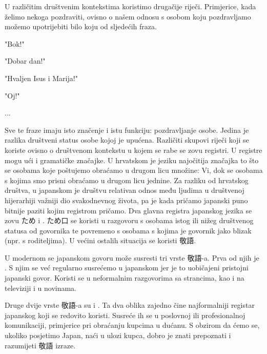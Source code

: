 
\author{Ivan Petranović}

	
	
	U različitim društvenim kontekstima koristimo drugačije riječi. Primjerice, kada želimo nekoga pozdraviti, ovisno o našem odnosu s osobom koju pozdravljamo možemo upotrijebiti bilo koju od sljedećih fraza.
	\begin{hyou}
	\item "Bok!"
	\item "Dobar dan!"
	\item "Hvaljen Isus i Marija!"
	\item "Oj!"
	\item ...
	\end{hyou}
	Sve te fraze imaju isto značenje i istu funkciju: pozdravljanje osobe. Jedina je razlika društveni status osobe kojoj je upućena. Različiti skupovi riječi koji se koriste ovisno o društvenom kontekstu u kojem se rabe se zovu registri. U registre mogu ući i gramatičke značajke. U hrvatskom je jeziku najočitija značajka to što se osobama koje poštujemo obraćamo u drugom licu množine: Vi, dok se osobama s kojima smo prisni obraćamo u drugom licu jednine.
	Za razliku od hrvatskog društva, u japanskom je društvu relativan odnos među ljudima u društvenoj hijerarhiji važniji dio svakodnevnog života, pa je kada pričamo japanski puno bitnije paziti kojim registrom pričamo.
	Dva glavna registra japanskog jezika se zovu ため i . ため口 se koristi u razgovoru s osobama istog ili nižeg društvenog statusa od govornika te povremeno s osobama s kojima je govornik jako blizak (npr. s roditeljima). U većini ostalih situacija se koristi 敬語.

	
	U modernom se japanskom govoru može susresti tri vrste 敬語-a. Prva od njih je . S njim se već regularno susrećemo u japanskom jer je to uobičajeni pristojni japanski govor. Koristi se u neformalnim razgovorima sa strancima, kao i na televiziji i u novinama.
		
	Druge dvije vrste 敬語-a su  i . Ta dva oblika zajedno čine najformalniji registar japanskog koji se redovito koristi. Susreće ih se u poslovnoj ili profesionalnoj komunikaciji, primjerice pri obraćanju kupcima u dućanu. S obzirom da ćemo se, ukoliko posjetimo Japan, naći u ulozi kupca, dobro je znati prepoznati i razumijeti 敬語 izraze.
		
